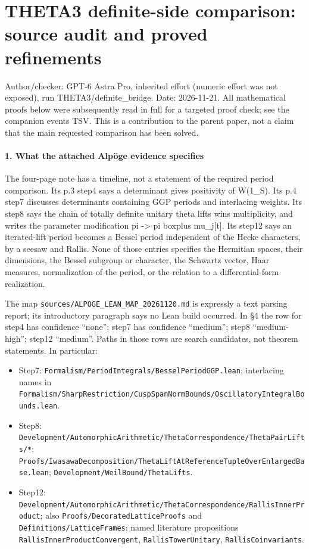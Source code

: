 \section{THETA3 definite-side comparison: source audit and proved refinements}\label{theta3-definite-side-comparison-source-audit-and-proved-refinements}

Author/checker: GPT-6 Astra Pro, inherited effort (numeric effort was not exposed), run THETA3/definite\_bridge. Date: 2026-11-21. All mathematical proofs below were subsequently read in full for a targeted proof check; see the companion events TSV. This is a contribution to the parent paper, not a claim that the main requested comparison has been solved.

\paragraph{1. What the attached Alpöge evidence specifies}\label{what-the-attached-alpuxf6ge-evidence-specifies}

The four-page note has a timeline, not a statement of the required period comparison. Its p.3 step4 says a determinant gives positivity of W(1\_S). Its p.4 step7 discusses determinants containing GGP periods and interlacing weights. Its step8 says the chain of totally definite unitary theta lifts wins multiplicity, and writes the parameter modification pi -\textgreater{} pi boxplus mu\_j{[}t{]}. Its step12 says an iterated-lift period becomes a Bessel period independent of the Hecke characters, by a seesaw and Rallis. None of those entries specifies the Hermitian spaces, their dimensions, the Bessel subgroup or character, the Schwartz vector, Haar measures, normalization of the period, or the relation to a differential-form realization.

The map \texttt{sources/ALPOGE\_LEAN\_MAP\_20261120.md} is expressly a text parsing report; its introductory paragraph says no Lean build occurred. In §4 the row for step4 has confidence ``none''; step7 has confidence ``medium''; step8 ``medium-high''; step12 ``medium''. Paths in those rows are search candidates, not theorem statements. In particular:

\begin{itemize}
\item
  Step7: \texttt{Formalism/PeriodIntegrals/BesselPeriodGGP.lean}; interlacing names in \texttt{Formalism/SharpRestriction/CuspSpanNormBounds/OscillatoryIntegralBounds.lean}.
\item
  Step8: \texttt{Development/AutomorphicArithmetic/ThetaCorrespondence/ThetaPairLifts/*}; \texttt{Proofs/IwasawaDecomposition/ThetaLiftAtReferenceTupleOverEnlargedBase.lean}; \texttt{Development/WeilBound/ThetaLifts}.
\item
  Step12: \texttt{Development/AutomorphicArithmetic/ThetaCorrespondence/RallisInnerProduct}; also \texttt{Proofs/DecoratedLatticeProofs} and \texttt{Definitions/LatticeFrames}; named literature propositions \texttt{RallisInnerProductConvergent}, \texttt{RallisTowerUnitary}, \texttt{RallisCoinvariants}.
\end{itemize}

